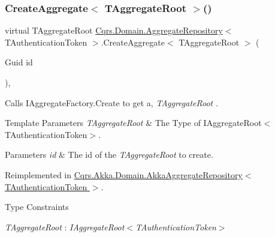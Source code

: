 \subsubsection{\texorpdfstring{Create\+Aggregate$<$ T\+Aggregate\+Root $>$()}{CreateAggregate< TAggregateRoot >()}}
{\footnotesize\ttfamily virtual T\+Aggregate\+Root \hyperlink{classCqrs_1_1Domain_1_1AggregateRepository}{Cqrs.\+Domain.\+Aggregate\+Repository}$<$ T\+Authentication\+Token $>$.Create\+Aggregate$<$ T\+Aggregate\+Root $>$ (\begin{DoxyParamCaption}\item[{Guid}]{id }\end{DoxyParamCaption})\hspace{0.3cm}{\ttfamily [protected]}, {\ttfamily [virtual]}}



Calls I\+Aggregate\+Factory.\+Create to get a, {\itshape T\+Aggregate\+Root} . 


\begin{DoxyTemplParams}{Template Parameters}
{\em T\+Aggregate\+Root} & The Type of I\+Aggregate\+Root$<$\+T\+Authentication\+Token$>$.\\
\hline
\end{DoxyTemplParams}

\begin{DoxyParams}{Parameters}
{\em id} & The id of the {\itshape T\+Aggregate\+Root}  to create.\\
\hline
\end{DoxyParams}


Reimplemented in \hyperlink{classCqrs_1_1Akka_1_1Domain_1_1AkkaAggregateRepository_a889a80595755372614382c36092f30dc_a889a80595755372614382c36092f30dc}{Cqrs.\+Akka.\+Domain.\+Akka\+Aggregate\+Repository$<$ T\+Authentication\+Token $>$}.

\begin{Desc}
\item[Type Constraints]\begin{description}
\item[{\em T\+Aggregate\+Root} : {\em I\+Aggregate\+Root$<$T\+Authentication\+Token$>$}]\end{description}
\end{Desc}
\mbox{\label{classCqrs_1_1Domain_1_1AggregateRepository_a0e55881812d463129df34189d29544b6_a0e55881812d463129df34189d29544b6}} 

